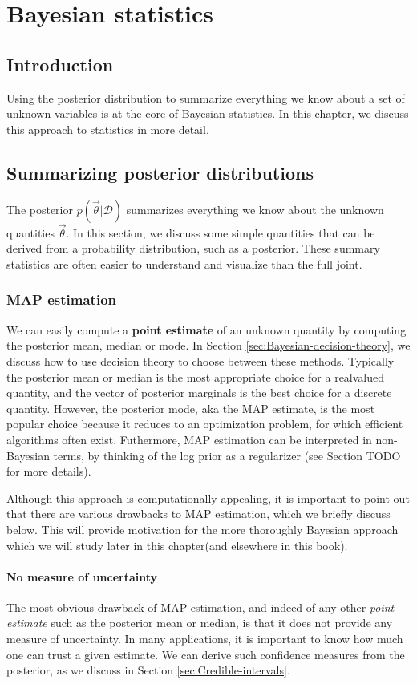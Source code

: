 \chapter{Bayesian statistics}


\section{Introduction}
Using the posterior distribution to summarize everything we know about a set of unknown variables is at the core of Bayesian statistics. In this chapter, we discuss this approach to statistics in more detail.


\section{Summarizing posterior distributions}
The posterior $p(\vec{\theta}|\mathcal{D})$ summarizes everything we know about the unknown quantities $\vec{\theta}$. In this section, we discuss some simple quantities that can be derived from a probability distribution, such as a posterior. These summary statistics are often easier to understand and visualize than the full joint.


\subsection{MAP estimation}
We can easily compute a \textbf{point estimate} of an unknown quantity by computing the posterior mean, median or mode. In Section \ref{sec:Bayesian-decision-theory}, we discuss how to use decision theory to choose between these methods. Typically the posterior mean or median is the most appropriate choice for a realvalued quantity, and the vector of posterior marginals is the best choice for a discrete quantity. However, the posterior mode, aka the MAP estimate, is the most popular choice because it reduces to an optimization problem, for which efficient algorithms often exist. Futhermore, MAP estimation can be interpreted in non-Bayesian terms, by thinking of the log prior as a regularizer (see Section TODO for more details).

Although this approach is computationally appealing, it is important to point out that there are various drawbacks to MAP estimation, which we briefly discuss below. This will provide motivation for the more thoroughly Bayesian approach which we will study later in this chapter(and elsewhere in this book).


\subsubsection{No measure of uncertainty}
The most obvious drawback of MAP estimation, and indeed of any other \emph{point estimate} such as the posterior mean or median, is that it does not provide any measure of uncertainty. In many applications, it is important to know how much one can trust a given estimate. We can derive such confidence measures from the posterior, as we discuss in Section \ref{sec:Credible-intervals}.


